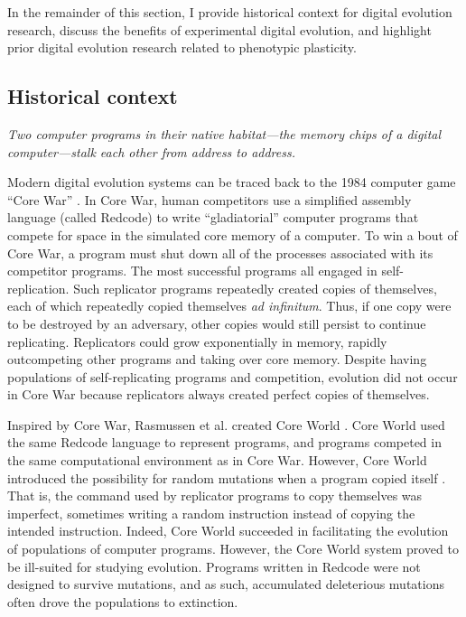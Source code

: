 In the remainder of this section, I provide historical context for digital evolution research, discuss the benefits of experimental digital evolution, and highlight prior digital evolution research related to phenotypic plasticity.

\subsection{Historical context}

\begin{displayquote}

\textit{Two computer programs in their native habitat---the memory chips of a digital computer---stalk each other from address to address.}  \citep{dewdney_core_wars_1984}

\end{displayquote}

Modern digital evolution systems can be traced back to the 1984 computer game ``Core War'' \citep{dewdney_core_wars_1984}.
In Core War, human competitors use a simplified assembly language (called Redcode) to write ``gladiatorial'' computer programs that compete for space in the simulated core memory of a computer.
To win a bout of Core War, a program must shut down all of the processes associated with its competitor programs.
The most successful programs all engaged in self-replication.
Such replicator programs repeatedly created copies of themselves, each of which repeatedly copied themselves \textit{ad infinitum}. 
Thus, if one copy were to be destroyed by an adversary, other copies would still persist to continue replicating. 
Replicators could grow exponentially in memory, rapidly outcompeting other programs and taking over core memory.
Despite having populations of self-replicating programs and competition, evolution did not occur in Core War because replicators always created perfect copies of themselves.

Inspired by Core War, Rasmussen et al. created Core World \citep{rasmussen_core_1989}.
Core World used the same Redcode language to represent programs, and programs competed in the same computational environment as in Core War.
However, Core World introduced the possibility for random mutations when a program copied itself \citep{rasmussen_core_1989,rasmussen_coreworld_1990}.
That is, the command used by replicator programs to copy themselves was imperfect, sometimes writing a random instruction instead of copying the intended instruction. 
Indeed, Core World succeeded in facilitating the evolution of populations of computer programs. 
However, the Core World system proved to be ill-suited for studying evolution.
Programs written in Redcode were not designed to survive mutations, and as such, accumulated deleterious mutations often drove the populations to extinction.

